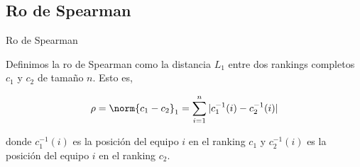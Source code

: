 \documentclass[10pt,hyperref={unicode}]{beamer}
\begin{document}
			
	
	\subsection*{Ro de Spearman}
	
	
	\begin{frame}{Ro de Spearman}
		\begin{defi}
			Definimos la ro de Spearman como la distancia $L_1$ entre dos rankings completos $c_1$ y $c_2$ de tamaño $n$. Esto es, 
			
			\begin{equation}
			\rho = \norm{c_1 - c_2}_1 = \sum\limits_{i=1}^{n} |c_1^{-1}(i) - c_2^{-1}(i)|
			\end{equation}
			
			donde $c_1^{-1}(i)$ es la posición del equipo $i$ en el ranking $c_1$ y $c_2^{-1}(i)$ es la posición del equipo $i$ en el ranking $c_2$.
		\end{defi}
	
	\end{frame}
	
			
\end{document}
